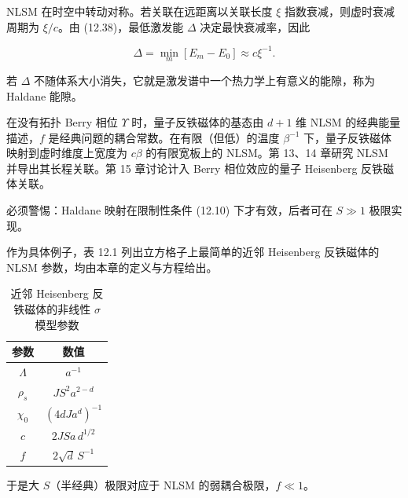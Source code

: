 NLSM 在时空中转动对称。若关联在远距离以关联长度 $\xi$ 指数衰减，则虚时衰减周期为 $\xi/c$。由 (12.38)，最低激发能 $\Delta$ 决定最快衰减率，因此

\begin{equation*}
\Delta = \min_{m} \left[ E _ {m} - E _ {0} \right] \approx c \xi^ {- 1}.
\tag{12.39}
\end{equation*}

若 $\Delta$ 不随体系大小消失，它就是激发谱中一个热力学上有意义的能隙，称为 Haldane 能隙。

在没有拓扑 Berry 相位 $\Upsilon$ 时，量子反铁磁体的基态由 $d+1$ 维 NLSM 的经典能量描述，$f$ 是经典问题的耦合常数。在有限（但低）的温度 $\beta^{-1}$ 下，量子反铁磁体映射到虚时维度上宽度为 $c\beta$ 的有限宽板上的 NLSM。第 13、14 章研究 NLSM 并导出其长程关联。第 15 章讨论计入 Berry 相位效应的量子 Heisenberg 反铁磁体关联。

必须警惕：Haldane 映射在限制性条件 (12.10) 下才有效，后者可在 $S \gg 1$ 极限实现。

作为具体例子，表 12.1 列出立方格子上最简单的近邻 Heisenberg 反铁磁体的 NLSM 参数，均由本章的定义与方程给出。

\begin{table}[H]
\centering
\caption{近邻 Heisenberg 反铁磁体的非线性 {$\sigma$} 模型参数}
\label{tab:12.1}
\begin{tabular}{cc}
\toprule
参数 & 数值 \\
\midrule
$\Lambda$ & $a^{-1}$ \\
$\rho_s$ & $J S^2 a^{2-d}$ \\
$\chi_0$ & $(4 d J a^{d})^{-1}$ \\
$c$ & $2 J S a \, d^{1/2}$ \\
$f$ & $2 \sqrt{d} \, S^{-1}$ \\
\bottomrule
\end{tabular}
\end{table}

于是大 $S$（半经典）极限对应于 NLSM 的弱耦合极限，$f \ll 1$。

